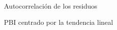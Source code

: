 \documentclass[a4paper]{article}
\begin{document}
\begin{figure}[H]
	\centering
	\caption{Autocorrelación de los residuos}
	\label{fig:cpi_cntr_acf}
\end{figure}

\begin{figure}[H]
	\centering
	\caption{PBI centrado por la tendencia lineal} 	
	\label{fig:PBI_cntr}
\end{figure}
\end{document}
